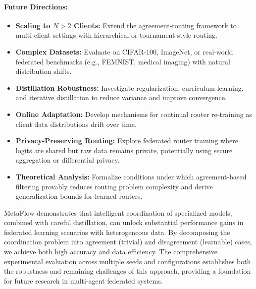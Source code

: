 \documentclass[12pt]{article}
\begin{document}
\paragraph{Future Directions:}

\begin{itemize}
    \item \textbf{Scaling to $N > 2$ Clients:} Extend the agreement-routing framework to multi-client settings with hierarchical or tournament-style routing.
    
    \item \textbf{Complex Datasets:} Evaluate on CIFAR-100, ImageNet, or real-world federated benchmarks (e.g., FEMNIST, medical imaging) with natural distribution shifts.
    
    \item \textbf{Distillation Robustness:} Investigate regularization, curriculum learning, and iterative distillation to reduce variance and improve convergence.
    
    \item \textbf{Online Adaptation:} Develop mechanisms for continual router re-training as client data distributions drift over time.
    
    \item \textbf{Privacy-Preserving Routing:} Explore federated router training where logits are shared but raw data remains private, potentially using secure aggregation or differential privacy.
    
    \item \textbf{Theoretical Analysis:} Formalize conditions under which agreement-based filtering provably reduces routing problem complexity and derive generalization bounds for learned routers.
\end{itemize}

MetaFlow demonstrates that intelligent coordination of specialized models, combined with careful distillation, can unlock substantial performance gains in federated learning scenarios with heterogeneous data. By decomposing the coordination problem into agreement (trivial) and disagreement (learnable) cases, we achieve both high accuracy and data efficiency. The comprehensive experimental evaluation across multiple seeds and configurations establishes both the robustness and remaining challenges of this approach, providing a foundation for future research in multi-agent federated systems.
\end{document}
